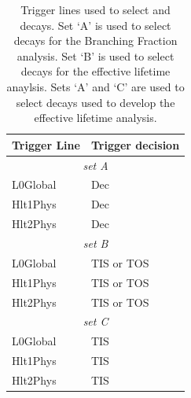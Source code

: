 \begin{table}[ht]
\begin{center}
\begin{tabular}{ll}
\hline
Trigger Line	& Trigger decision \\ \hline
\multicolumn{2}{c}{{\it set A}} \\ \hline
L0Global	& Dec\\
Hlt1Phys	& Dec \\
Hlt2Phys	& Dec \\ \hline
\multicolumn{2}{c}{{\it set B}} \\ \hline
L0Global	& TIS or TOS \\
Hlt1Phys	& TIS or TOS \\
Hlt2Phys	& TIS or TOS \\ \hline
\multicolumn{2}{c}{{\it set C}} \\ \hline
L0Global	& TIS\\
Hlt1Phys	& TIS \\
Hlt2Phys	& TIS \\ \hline
\end{tabular}
\vspace{0.7cm}
\caption{Trigger lines used to select \bsmumu and \bhh decays. Set `A' is used to select decays for the Branching Fraction analysis. Set `B' is used to select \bsmumu decays for the effective lifetime anaylsis. Sets `A' and `C' are used to select \bhh decays used to develop the \bsmumu effective lifetime analysis.}
\label{tab:triggers}
\end{center}
\end{table}



